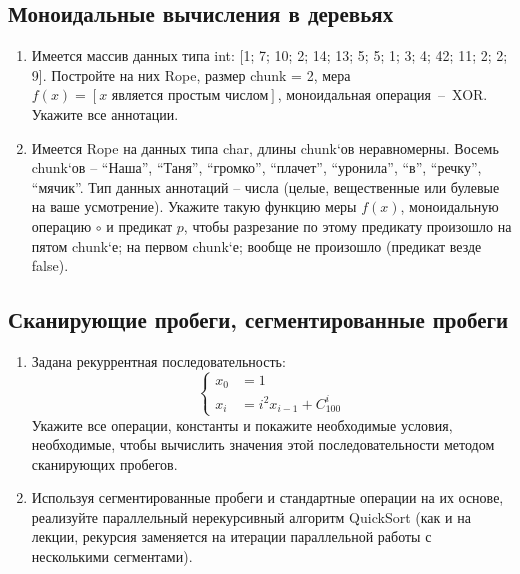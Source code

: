 \documentclass[a4paper,11pt]{article}
\newcommand{\<}{\langle}
\renewcommand{\>}{\rangle}
\begin{document}
\subsection*{Моноидальные вычисления в деревьях}
\begin{enumerate}
\item Имеется массив данных типа int: [1; 7; 10; 2; 14; 13; 5; 5; 1; 3;
  4; 42; 11; 2; 2; 9]. Постройте на них Rope, размер chunk = 2, мера
  $f(x) = [x\text{ является простым числом}]$, моноидальная операция~--~XOR.
  Укажите все аннотации.

\item Имеется Rope на данных типа char, длины chunk`ов неравномерны.
  Восемь chunk`ов -- ``Наша'', ``Таня'', ``громко'', ``плачет'',
  ``уронила'', ``в'', ``речку'', ``мячик''. Тип данных аннотаций --
  числа (целые, вещественные или булевые на ваше усмотрение). Укажите
  такую функцию меры $f(x)$, моноидальную операцию $\circ$ и предикат $p$,
  чтобы разрезание по этому предикату произошло на пятом chunk`е; на первом
  chunk`е; вообще не произошло (предикат везде false).
\end{enumerate}

\subsection*{Сканирующие пробеги, сегментированные пробеги}
\begin{enumerate}
\item Задана рекуррентная последовательность:
  $$\left\{
  \begin{aligned}
    x_0 &= 1 \\
    x_i &= i^2 x_{i-1} + C_{100}^i
  \end{aligned}
  \right.$$
  Укажите все операции, константы и покажите необходимые условия, необходимые,
  чтобы вычислить значения этой последовательности методом сканирующих пробегов.

\item Используя сегментированные пробеги и стандартные операции на их основе,
  реализуйте параллельный нерекурсивный алгоритм QuickSort (как и на лекции,
  рекурсия заменяется на итерации параллельной работы с несколькими сегментами).
\end{enumerate}
\end{document}
